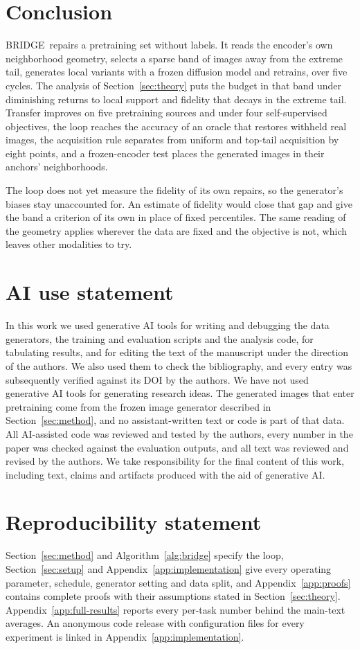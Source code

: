 \documentclass{article}
\newcommand{\method}{BRIDGE}
\begin{document}
\section{Conclusion}
\method\ repairs a pretraining set without labels. It reads the encoder's own neighborhood geometry, selects a sparse band of images away from the extreme tail, generates local variants with a frozen diffusion model and retrains, over five cycles. The analysis of Section~\ref{sec:theory} puts the budget in that band under diminishing returns to local support and fidelity that decays in the extreme tail. Transfer improves on five pretraining sources and under four self-supervised objectives, the loop reaches the accuracy of an oracle that restores withheld real images, the acquisition rule separates from uniform and top-tail acquisition by eight points, and a frozen-encoder test places the generated images in their anchors' neighborhoods.

The loop does not yet measure the fidelity of its own repairs, so the generator's biases stay unaccounted for. An estimate of fidelity would close that gap and give the band a criterion of its own in place of fixed percentiles. The same reading of the geometry applies wherever the data are fixed and the objective is not, which leaves other modalities to try.

\section*{AI use statement}
In this work we used generative AI tools for writing and debugging the data generators, the training
and evaluation scripts and the analysis code, for tabulating results, and
for editing the text of the manuscript under the direction of
the authors. We also used them to check the bibliography, and every entry
was subsequently verified against its DOI by the authors. We have not used
generative AI tools for generating research ideas. The generated images
that enter pretraining come from the frozen image generator described in
Section~\ref{sec:method}, and no assistant-written text or code is part of
that data. All AI-assisted code was reviewed and
tested by the authors, every number in the paper was checked against the
evaluation outputs, and all text was reviewed and revised by the authors.
We take responsibility for the final content of this work, including text,
claims and artifacts produced with the aid of generative AI.

\section*{Reproducibility statement}
Section~\ref{sec:method} and Algorithm~\ref{alg:bridge} specify the loop, Section~\ref{sec:setup} and Appendix~\ref{app:implementation} give every operating parameter, schedule, generator setting and data split, and Appendix~\ref{app:proofs} contains complete proofs with their assumptions stated in Section~\ref{sec:theory}. Appendix~\ref{app:full-results} reports every per-task number behind the main-text averages. An anonymous code release with configuration files for every experiment is linked in Appendix~\ref{app:implementation}.
\end{document}
